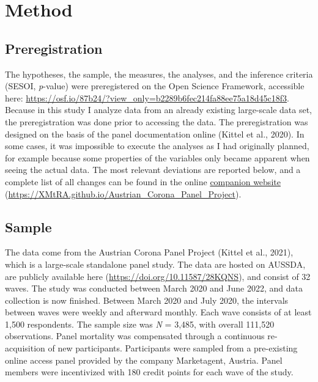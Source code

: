 \documentclass[
  man,mask,floatsintext]{apa7}
\begin{document}
\hypertarget{method}{%
\section{Method}\label{method}}

\hypertarget{preregistration}{%
\subsection{Preregistration}\label{preregistration}}

The hypotheses, the sample, the measures, the analyses, and the inference criteria (SESOI, \emph{p}-value) were preregistered on the Open Science Framework, accessible here: \url{https://osf.io/87b24/?view_only=b2289b6fec214fa88ee75a18d45c18f3}.
Because in this study I analyze data from an already existing large-scale data set, the preregistration was done prior to accessing the data.
The preregistration was designed on the basis of the panel documentation online (Kittel et al., 2020).
In some cases, it was impossible to execute the analyses as I had originally planned, for example because some properties of the variables only became apparent when seeing the actual data.
The most relevant deviations are reported below, and a complete list of all changes can be found in the online \href{https://XMtRA.github.io/Austrian_Corona_Panel_Project}{companion website} (\url{https://XMtRA.github.io/Austrian_Corona_Panel_Project}).

\hypertarget{sample}{%
\subsection{Sample}\label{sample}}

The data come from the Austrian Corona Panel Project (Kittel et al., 2021), which is a large-scale standalone panel study.
The data are hosted on AUSSDA, are publicly available here (\url{https://doi.org/10.11587/28KQNS}), and consist of 32 waves.
The study was conducted between March 2020 and June 2022, and data collection is now finished.
Between March 2020 and July 2020, the intervals between waves were weekly and afterward monthly.
Each wave consists of at least 1,500 respondents.
The sample size was \emph{N} = 3,485, with overall 111,520 observations.
Panel mortality was compensated through a continuous re-acquisition of new participants.
Participants were sampled from a pre-existing online access panel provided by the company Marketagent, Austria.
Panel members were incentivized with 180 credit points for each wave of the study.
\end{document}
